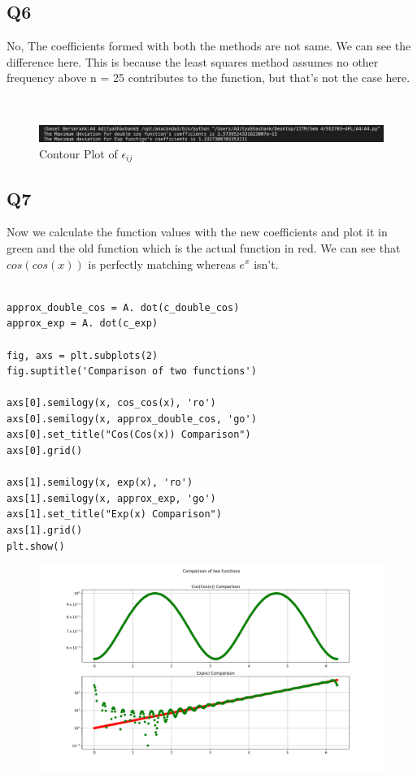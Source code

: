 \documentclass[12pt, a4paper]{report}
\begin{document}
 \subsection{Q6}
No, The coefficients formed with both the methods are not same. We can see the difference here. This is because the least squares method assumes no other frequency above n = 25 contributes to the function, but that's not the case here.
 
 \begin{Verbatim}


\end{Verbatim}

\begin{figure}[!tbh]
   	\centering
   	\includegraphics[scale=0.5]{4.png}
   	\caption{Contour Plot of $\epsilon_{ij}$}
   	\label{fig:sample}
   \end{figure}


 \subsection{Q7}
 Now we calculate the function values with the new coefficients and plot it in green and the old function which is the actual function in red. We can see that $cos(cos(x))$ is perfectly matching whereas $e^x$ isn't.
 
  \begin{Verbatim}
  
approx_double_cos = A. dot(c_double_cos)
approx_exp = A. dot(c_exp) 

fig, axs = plt.subplots(2)
fig.suptitle('Comparison of two functions')

axs[0].semilogy(x, cos_cos(x), 'ro')
axs[0].semilogy(x, approx_double_cos, 'go')
axs[0].set_title("Cos(Cos(x)) Comparison")
axs[0].grid()

axs[1].semilogy(x, exp(x), 'ro')
axs[1].semilogy(x, approx_exp, 'go')
axs[1].set_title("Exp(x) Comparison")
axs[1].grid()
plt.show()

\end{Verbatim}


\begin{figure}[!tbh]
   	\centering
   	\includegraphics[scale=0.5]{Q6.png}
   	\label{fig:sample}
   \end{figure}
   
\end{document}
